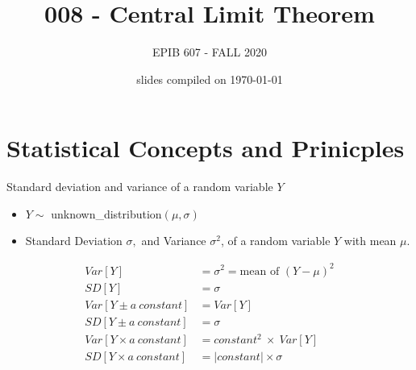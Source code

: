 \documentclass[10pt,handout]{beamer}\usepackage[]{graphicx}\usepackage[]{color}
\begin{document}

	\title{008 - Central Limit Theorem}
\author{EPIB 607 - FALL 2020}

\date{slides compiled on \today}

\maketitle

\section{Statistical Concepts and Prinicples}


\begin{frame}{Standard deviation and variance of a random variable $Y$}
	\begin{itemize}
		\tightlist
		\item $Y \sim$ unknown\_distribution$(\mu, \sigma)$
		\item Standard Deviation \(\sigma,\) and Variance \(\sigma^2\), of a random variable \(Y\) with mean \(\mu\).
	\end{itemize}

\begin{align*}
Var[Y] &= \sigma^2 = \textrm{mean of } (Y - \mu)^2 \\
SD[Y] &= \sigma \\
Var[Y \pm a \ constant] &= Var[Y] \\
SD[Y \pm a \ constant] &= \sigma \\
Var[Y \times a \ constant] &= constant^2 \ \times \ Var[Y] \\
SD[Y \times a \ constant] &= |constant| \times \sigma
\end{align*}	


\end{frame}
\end{document}

